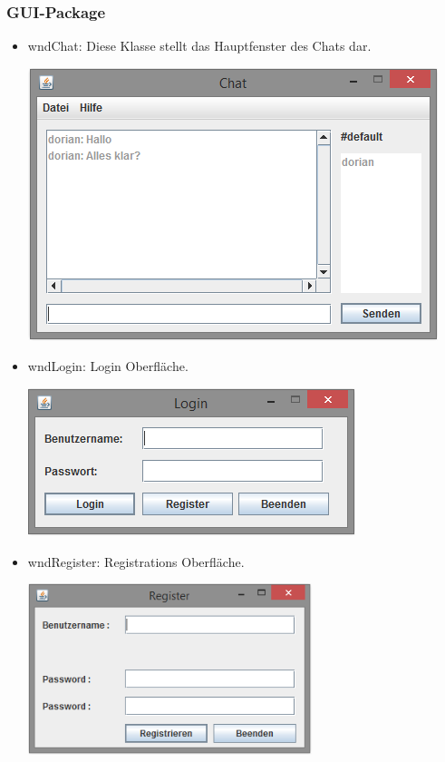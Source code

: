 \documentclass[a4paper,12pt]{scrartcl}
\begin{document}
\subsubsection{GUI-Package}
\begin{itemize}
\item wndChat: Diese Klasse stellt das Hauptfenster des Chats dar.\\
\begin{minipage}{\linewidth}
            \centering
            \includegraphics{Bilder/main_client.png}
\end{minipage}

\item wndLogin: Login Oberfläche. \\
\begin{minipage}{\linewidth}
            \centering
            \includegraphics{Bilder/login_client.png}
\end{minipage}

\item wndRegister: Registrations Oberfläche. \\
\begin{minipage}{\linewidth}
            \centering
            \includegraphics[height=5cm]{Bilder/register_client.png}
\end{minipage}
\end{itemize}
\end{document}
